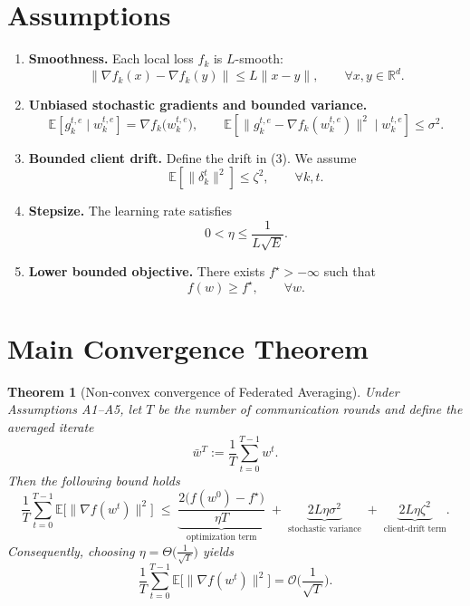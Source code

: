 \documentclass{article}
\newtheorem{theorem}{Theorem}
\begin{document}
\newpage
\section*{Assumptions}
\begin{enumerate}[label=\textbf{A\arabic*.}, leftmargin=*, nosep]
\item \textbf{Smoothness.} Each local loss \(f_k\) is \(L\)-smooth:
\[
\|\nabla f_k(x)-\nabla f_k(y)\|\le L\|x-y\|,\qquad\forall x,y\in\mathbb{R}^{d}. \tag{A1}
\]
\item \textbf{Unbiased stochastic gradients and bounded variance.}
\[
\mathbb{E}\!\left[g_{k}^{t,e}\mid w_{k}^{t,e}\right]=\nabla f_k\!\big(w_{k}^{t,e}\big),\qquad
\mathbb{E}\!\left[\|g_{k}^{t,e}-\nabla f_k(w_{k}^{t,e})\|^{2}\mid w_{k}^{t,e}\right]\le\sigma^{2}. \tag{A2}
\]
\item \textbf{Bounded client drift.} Define the drift in (3). We assume
\[
\mathbb{E}\!\left[\|\delta_{k}^{t}\|^{2}\right]\le \zeta^{2},\qquad\forall k,t. \tag{A3}
\]
\item \textbf{Stepsize.} The learning rate satisfies
\[
0<\eta\le \frac{1}{L\sqrt{E}}. \tag{A4}
\]
\item \textbf{Lower bounded objective.} There exists \(f^{\star}>-\infty\) such that
\[
f(w)\ge f^{\star},\qquad\forall w. \tag{A5}
\]
\end{enumerate}

\section*{Main Convergence Theorem}
\begin{theorem}[Non‑convex convergence of Federated Averaging]\label{thm:main}
Under Assumptions A1–A5, let \(T\) be the number of communication rounds and define the averaged iterate
\[
\bar w^{T}:=\frac1T\sum_{t=0}^{T-1} w^{t}.
\]
Then the following bound holds
\[
\frac1T\sum_{t=0}^{T-1}\mathbb{E}\!\big[\|\nabla f(w^{t})\|^{2}\big]
\;\le\;
\underbrace{\frac{2\big(f(w^{0})-f^{\star}\big)}{\eta T}}_{\text{optimization term}}
\;+\;
\underbrace{2L\eta\sigma^{2}}_{\text{stochastic variance}}
\;+\;
\underbrace{2L\eta\zeta^{2}}_{\text{client‑drift term}} .
\tag{4}
\]
Consequently, choosing \(\eta = \Theta\!\big(\tfrac{1}{\sqrt{T}}\big)\) yields
\[
\frac1T\sum_{t=0}^{T-1}\mathbb{E}\!\big[\|\nabla f(w^{t})\|^{2}\big]=\mathcal{O}\!\Big(\frac{1}{\sqrt{T}}\Big).
\]
\end{theorem}
\end{document}
